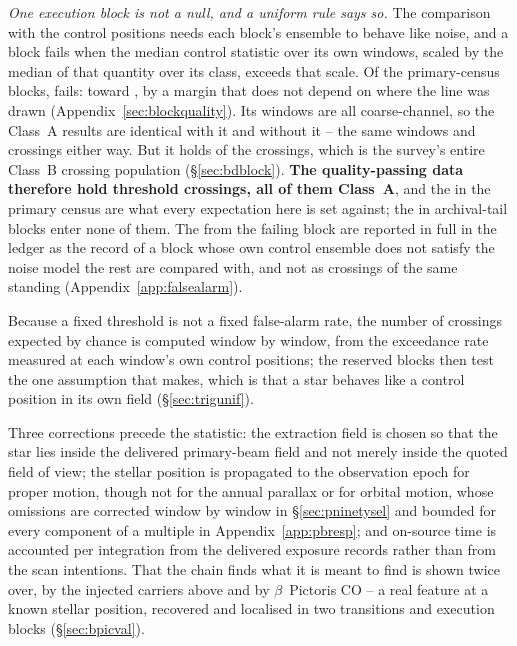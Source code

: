 \emph{One execution block is not a null, and a uniform rule says so.}
The comparison with the control positions needs each block's ensemble to behave
like noise, and a block fails when the median control statistic over its own
windows, scaled by the median of that quantity over its class, exceeds
\BqFactor{} that scale. Of the \BqNBlocks{} primary-census blocks, \BqNFail{} fails:
\BqFailBlock{} toward \BqFailStar, by a margin that does not depend on where
the line was drawn (Appendix~\ref{sec:blockquality}).
Its \BqFailNWin{} windows are all coarse-channel, so the Class~A
results are identical with it and without it -- the same \BqWinACut{} windows
and \BqXrossACut{} crossings either way. But it holds \BqFailNCross{} of the
\NCross{} crossings, which is the survey's entire Class~B crossing
population (\S\ref{sec:bdblock}). \textbf{The quality-passing data therefore hold
\EvNCrossQp{} threshold crossings, all of them Class~A}, and the
\CkNCrossCenA{} in the primary census are what every expectation here is set
against; the \CeNTailCrossWord{} in archival-tail blocks enter none of them.
The \BqFailNCross{} from the failing block are
reported in full in the ledger as the record of a block whose own control
ensemble does not satisfy the noise model the rest are compared with, and not
as crossings of the same standing (Appendix~\ref{app:falsealarm}).

Because a fixed threshold is not a fixed false-alarm rate, the number of
crossings expected by chance is computed window by window, from the
exceedance rate measured at each window's own control positions; the reserved
blocks then test the one assumption that makes, which is that a star behaves
like a control position in its own field (\S\ref{sec:trigunif}).

Three corrections precede the statistic: the extraction field is chosen so
that the star lies inside the delivered primary-beam field and not merely
inside the quoted field of view; the stellar position is propagated to the
observation epoch for proper motion, though not for the annual parallax or
for orbital motion, whose omissions are corrected window by window in
\S\ref{sec:pninetysel} and bounded for every component of a multiple in
Appendix~\ref{app:pbresp}; and on-source time is accounted per integration
from the
delivered exposure records rather than from the scan intentions. That the
chain finds what it is meant to find is shown twice over, by the injected
carriers above and by $\beta$~Pictoris CO -- a real feature at a known
stellar position, recovered and localised in two transitions and
\NStageOneBpicEb{} execution blocks (\S\ref{sec:bpicval}).

